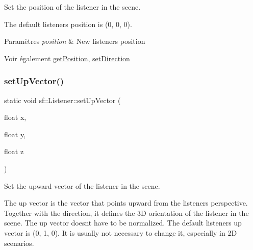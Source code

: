 Set the position of the listener in the scene. 

The default listener\textquotesingle{}s position is (0, 0, 0).


\begin{DoxyParams}{Paramètres}
{\em position} & New listener\textquotesingle{}s position\\
\hline
\end{DoxyParams}
\begin{DoxySeeAlso}{Voir également}
\hyperlink{classsf_1_1Listener_acd7ee65bc948ca38e1c669aa12340c54}{get\+Position}, \hyperlink{classsf_1_1Listener_ae479dc15513c6557984d26e32d06d06e}{set\+Direction} 
\end{DoxySeeAlso}
\mbox{\label{classsf_1_1Listener_a0ea9b3083a994b2b90253543bc4e3ad6}} 
\subsubsection{\texorpdfstring{set\+Up\+Vector()}{setUpVector()}\hspace{0.1cm}{\footnotesize\ttfamily [1/2]}}
{\footnotesize\ttfamily static void sf\+::\+Listener\+::set\+Up\+Vector (\begin{DoxyParamCaption}\item[{float}]{x,  }\item[{float}]{y,  }\item[{float}]{z }\end{DoxyParamCaption})\hspace{0.3cm}{\ttfamily [static]}}



Set the upward vector of the listener in the scene. 

The up vector is the vector that points upward from the listener\textquotesingle{}s perspective. Together with the direction, it defines the 3D orientation of the listener in the scene. The up vector doesn\textquotesingle{}t have to be normalized. The default listener\textquotesingle{}s up vector is (0, 1, 0). It is usually not necessary to change it, especially in 2D scenarios.


